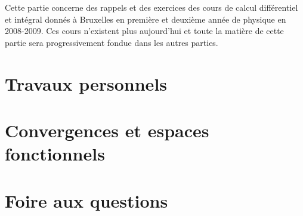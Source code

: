 Cette partie concerne des rappels et des exercices des cours de calcul différentiel et intégral donnés à Bruxelles en première et deuxième année de physique en 2008-2009. Ces cours n'existent plus aujourd'hui et toute la matière de cette partie sera progressivement fondue dans les autres parties.

\chapter{Travaux personnels}


\chapter{Convergences et espaces fonctionnels}
	

\chapter{Foire aux questions}
	

